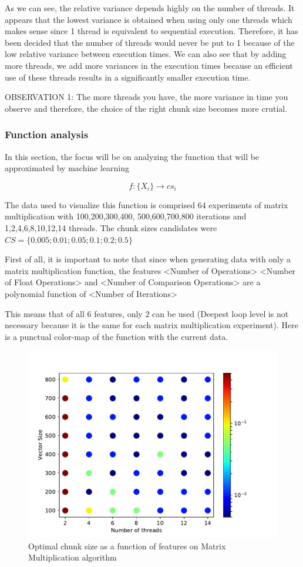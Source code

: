 \documentclass[12pt]{article}
\begin{document}
As we can see, the relative variance depends highly on the number of threads. It appears that the lowest variance is obtained when using only one threads which makes sense since 1 thread is equivalent to sequential execution. Therefore, it has been decided that the number of threads would never be put to 1 because of the low relative variance between execution times. We can also see that by adding more threads, we add more variances in the execution times because an efficient use of these threads results in a significantly smaller execution time.

OBSERVATION 1: The more threads you have, the more variance in time you observe and therefore, the choice of the right chunk size becomes more crutial.
\subsubsection{Function analysis}
In this section, the focus will be on analyzing the function that will be approximated by machine learning

$$f:\{X_i\} \rightarrow cs_i$$

The data used to visualize this function is comprised 64 experiments of matrix multiplication with 100,200,300,400, 500,600,700,800 iterations and 1,2,4,6,8,10,12,14 threads. The chunk sizes candidates were $CS=\{0.005; 0.01 ;0.05; 0.1; 0.2; 0.5\}$

First of all, it is important to note that since when generating data with only a matrix multiplication function, the features <Number of Operations> <Number of Float Operations> and <Number of Comparison Operations> are a polynomial function of <Number of Iterations>

This means that of all 6 features, only 2 can be used (Deepest loop level is not necessary because it is the same for each matrix multiplication experiment). Here is a punctual color-map of the function with the current data.

\begin{figure}[H]
	\centering
	\includegraphics[width=120mm]{images/chunk_size_function_matrix.pdf}
	\caption{Optimal chunk size as a function of features on Matrix Multiplication algorithm}
\end{figure}
\end{document}
